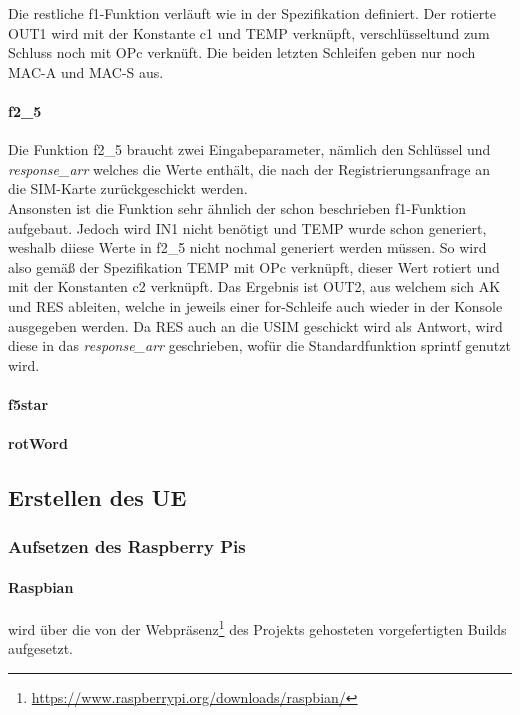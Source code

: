 		Die restliche f1-Funktion verläuft wie in der Spezifikation definiert. Der rotierte OUT1 wird mit der
		Konstante c1 und TEMP verknüpft, verschlüsseltund zum Schluss noch mit OPc verknüft. Die beiden letzten
		Schleifen geben nur noch MAC-A und MAC-S aus.		
		
		\paragraph{f2\_5}
		Die Funktion f2\_5 braucht zwei Eingabeparameter, nämlich den Schlüssel und \emph{response\_arr} welches
		die Werte enthält, die nach der Registrierungsanfrage an die SIM-Karte zurückgeschickt werden. \\
		Ansonsten ist die Funktion sehr ähnlich der schon beschrieben f1-Funktion aufgebaut. Jedoch wird IN1
		nicht benötigt und TEMP wurde schon generiert, weshalb diiese Werte in f2\_5 nicht nochmal generiert
		werden müssen. So wird also gemäß der Spezifikation TEMP mit OPc verknüpft, dieser Wert rotiert und mit
		der Konstanten c2 verknüpft. Das Ergebnis ist OUT2, aus welchem sich AK und RES ableiten, welche in jeweils
		einer for-Schleife auch wieder in der Konsole ausgegeben werden. Da RES auch an die USIM geschickt wird als
		Antwort, wird diese in das \emph{response\_arr} geschrieben, wofür die Standardfunktion sprintf genutzt wird.
		
		\paragraph{f5star}
		
		
		\paragraph{rotWord}
		
		
	\subsection{Erstellen des UE}
		\subsubsection{Aufsetzen des Raspberry Pis}
        \label{subsubsec:installpi}
			\paragraph{Raspbian} wird über die von der Webpräsenz\footnote{\url{https://www.raspberrypi.org/downloads/raspbian/}}
            des Projekts gehosteten vorgefertigten Builds aufgesetzt.

